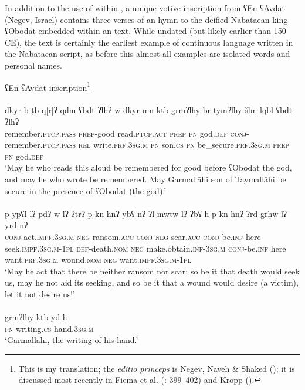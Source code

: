 \documentclass[output=paper]{langsci/langscibook}
\begin{document}
In addition to the use of  within , a unique votive inscription from ʕEn ʕAvdat (Negev, Israel) contains three verses of an  hymn to the deified Nabataean king ʕObodat embedded within an  text. While undated (but likely earlier than 150 CE), the text is certainly the earliest example of continuous  language written in the Nabataean script, as before this almost all examples are isolated words and personal names.\largerpage[-3]\pagebreak

\ea ʕEn ʕAvdat inscription\footnote{This is my translation; the \textit{editio princeps} is Negev, Naveh \& Shaked (\citeyear{Negevetal1986}); it is discussed most recently in Fiema et al. (\citeyear{Fiemaetal2015}: 399–402) and Kropp (\citeyear{Kropp2017}).} \\
 \\ 
\gll    dkyr b-ṭb q[r]ʔ qdm ʕbdt ʔlhʔ w-dkyr mn ktb grmʔlhy br tymʔlhy šlm lqbl ʕbdt ʔlhʔ \\
remember.\textsc{ptcp.pass} \textsc{prep}-good read.\textsc{ptcp.act} \textsc{prep} \textsc{pn} god.\textsc{def} \textsc{conj}-remember.\textsc{ptcp.pass} \textsc{rel} write.\textsc{prf.3sg.m} \textsc{pn} son.\textsc{cs} \textsc{pn} be\_secure.\textsc{prf.3sg.m} \textsc{prep} \textsc{pn} god.\textsc{def} \\ 
\glt `May he who reads this aloud be remembered for good before ʕObodat the god, and may he who wrote be remembered. May Garmallāhi son of Taymallāhi be secure in the presence of ʕObodat (the god).'\\

 \\
\gll   p-ypʕl lʔ pdʔ w-lʔ ʔtrʔ p-kn hnʔ ybʕ-nʔ ʔl-mwtw lʔ ʔbʕ-h p-kn hnʔ ʔrd grḥw lʔ yrd-nʔ \\
       \textsc{conj}-act.\textsc{impf.3sg.m} \textsc{neg} ransom.\textsc{acc} \textsc{conj}-\textsc{neg} scar.\textsc{acc} \textsc{conj}-be.\textsc{inf} here seek.\textsc{impf.3sg.m-1pl} \textsc{def}-death.\textsc{nom} \textsc{neg} make.obtain.\textsc{inf-3sg.m} \textsc{conj}-be.\textsc{inf} here want.\textsc{prf.3sg.m} wound.\textsc{nom} \textsc{neg} want.\textsc{impf.3sg.m-1pl} \\
\glt `May he act that there be neither ransom nor scar; so be it that death would seek us, may he not aid its seeking, and so be it that a wound would desire (a victim), let it not desire us!'\\

 \\
\gll   grmʔlhy ktb yd-h \\
\textsc{pn} writing.\textsc{cs} hand.\textsc{3sg.m} \\
\glt `Garmallāhi, the writing of his hand.’\\
\z
\z
\end{document}
